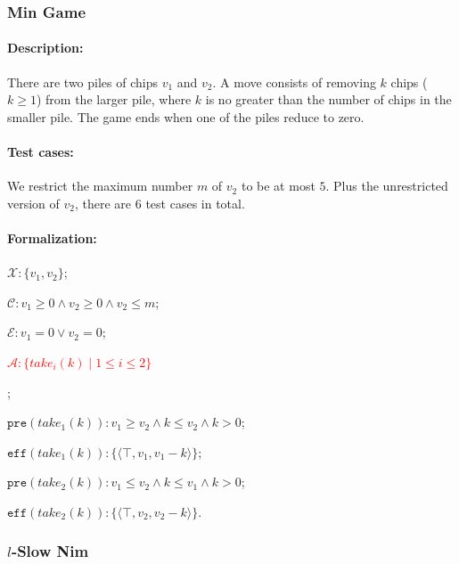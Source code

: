 \documentclass[review]{elsarticle}
\newcommand{\set}[1]{\{ #1 \}}
\newcommand{\tuple}[1]{\langle {#1} \rangle}
\newcommand{\true}{\top}
\newcommand{\statevar}{\mathcal{X}}
\newcommand{\act}{\mathcal{A}}
\newcommand{\constraint}{\mathcal{C}}
\newcommand{\estate}{\mathcal{E}}
\newcommand{\pre}{\mathtt{pre}}
\newcommand{\eff}{\mathtt{eff}}
\begin{document}
\subsubsection{Min Game \protect\cite{CaiH2010}}
\paragraph{Description:} 
There are two piles  of chips $v_1$ and $v_2$. 
A move consists of removing $k$ chips ($k \geq 1$) from the larger pile, where $k$ is no greater than the number of chips in the smaller pile.
The game ends when one of the piles reduce to zero.

\paragraph{Test cases:} 
We restrict the maximum number $m$ of $v_2$ to be at most $5$. 
Plus the unrestricted version of $v_2$, there are $6$ test cases in total.
\paragraph{Formalization:}

\begin{itemize}
	\item $\statevar: \set{v_1, v_2}$;
	\item $\constraint: v_1 \ge 0 \wedge v_2 \ge 0\wedge v_2 \le m$;
	\item $\estate: v_1=0 \vee v_2 =0$;
	\textcolor{red}{\item $\act:\set{take_i(k){\mid}1\le i \le2 }$};
	\item $\pre(take_1(k)) : v_1 \ge v_2 \wedge k \le v_2 \wedge k > 0$;
	\item $\eff(take_1(k)) : \set{\tuple{\true, v_1, v_1-k}}$;
	\item $\pre(take_2(k)) : v_1 \le v_2 \wedge k \le v_1 \wedge k > 0$;
	\item $\eff(take_2(k)) : \set{\tuple{\true, v_2, v_2-k}}$.
	
\end{itemize}



\subsubsection{$l$-Slow Nim \protect\cite{AhnCCEFGGKMPS2017}}
\end{document}
